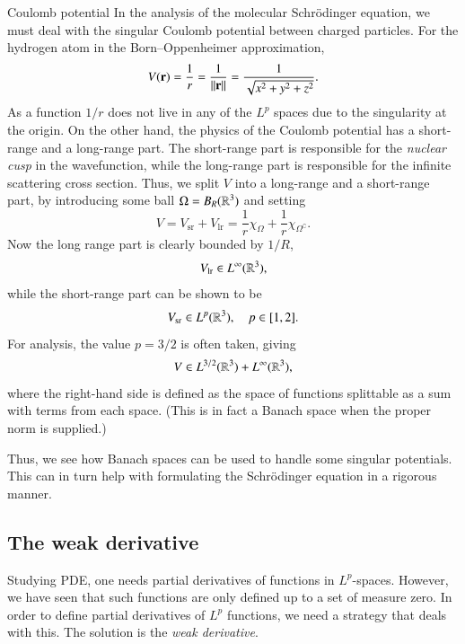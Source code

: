 \begin{myExample}{Coulomb potential}{}
In the analysis of the molecular Schrödinger equation, we must deal with the singular Coulomb potential between charged particles. For the hydrogen atom in the Born--Oppenheimer approximation,
\begin{equation}
V(\mathbf{r}) = \frac{1}{r} = \frac{1}{\|\mathbf{r}\|} = \frac{1}{\sqrt{x^2 + y^2 + z^2}}.
\end{equation}
As a function $1/r$ does not live in any of the $L^p$ spaces due to the singularity at the origin. On the other hand, the physics of the Coulomb potential has a short-range and a long-range part. The short-range part is responsible for the \emph{nuclear cusp} in the wavefunction, while the long-range part is responsible for the infinite scattering cross section. Thus, we split $V$ into a long-range and a short-range part, by introducing some ball $\Omega = B_R(\mathbb{R}^3)$ and setting
\begin{equation}
V = V_\text{sr} + V_\text{lr} = \frac{1}{r} \chi_\Omega + \frac{1}{r}\chi_{\Omega^\complement}.
\end{equation}
Now the long range part is clearly bounded by $1/R$,
\begin{equation}
    V_\text{lr} \in L^\infty(\mathbb{R}^3),
\end{equation}
while the short-range part can be shown to be
\begin{equation}
    V_\text{sr} \in L^p(\mathbb{R}^3), \quad p \in [1,2].
\end{equation}
For analysis, the value $p=3/2$ is often taken, giving
\begin{equation}
    V \in L^{3/2}(\mathbb{R}^3) + L^\infty(\mathbb{R}^3),
\end{equation}
where the right-hand side is defined as the space of functions splittable as a sum with terms from each space. (This is in fact a Banach space when the proper norm is supplied.)

Thus, we see how Banach spaces can be used to handle some  singular potentials. This can in turn help with formulating the Schr\"odinger equation in a rigorous manner.
\end{myExample}

\subsection{The weak derivative}

Studying PDE, one needs partial derivatives of functions in $L^p$-spaces. However, we have seen that such functions are only defined up to a set of measure zero. In order to define partial derivatives of $L^p$ functions, we need a strategy that deals with this. The solution is the \emph{weak derivative}.

